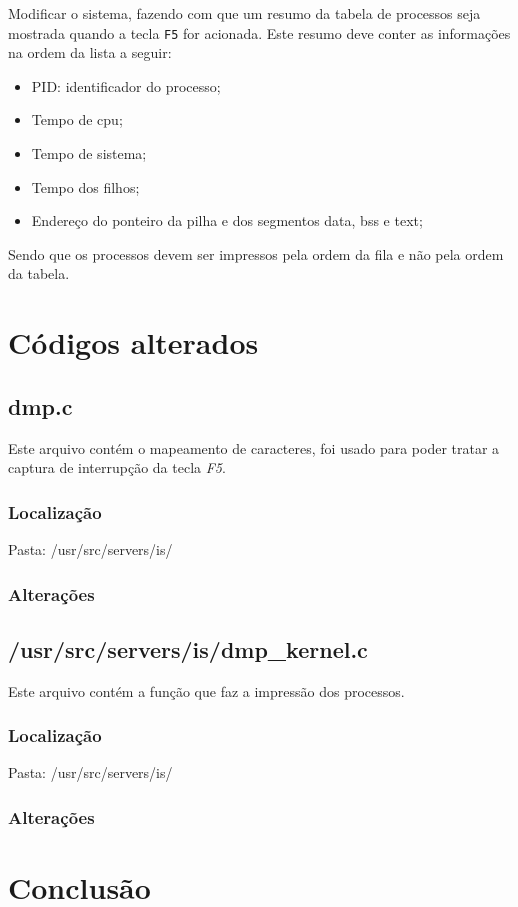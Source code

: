 \documentclass[12pt,a4paper]{article}
\begin{document}
   Modificar o sistema, fazendo com que um resumo da tabela de processos seja mostrada quando a tecla \verb+F5+ for acionada. Este resumo deve conter as informações na ordem da lista a seguir:

\begin{itemize}
\item PID: identificador do processo;
\item Tempo de cpu;
\item Tempo de sistema;
\item Tempo dos filhos;
\item Endereço do ponteiro da pilha e dos segmentos data, bss e text;
\end{itemize}

Sendo que os processos devem ser impressos pela ordem da fila e não pela ordem da tabela.

\section{Códigos alterados}

\subsection{dmp.c}

   Este arquivo contém o mapeamento de caracteres, foi usado para poder tratar a captura de interrupção da tecla \emph{F5}.

\subsubsection{Localização}

   Pasta: /usr/src/servers/is/

\subsubsection{Alterações}
   
   

\subsection{/usr/src/servers/is/dmp\_kernel.c}

   Este arquivo contém a função que faz a impressão dos processos.

\subsubsection{Localização}

   Pasta: /usr/src/servers/is/
   
\subsubsection{Alterações}

\section{Conclusão}
\end{document}
